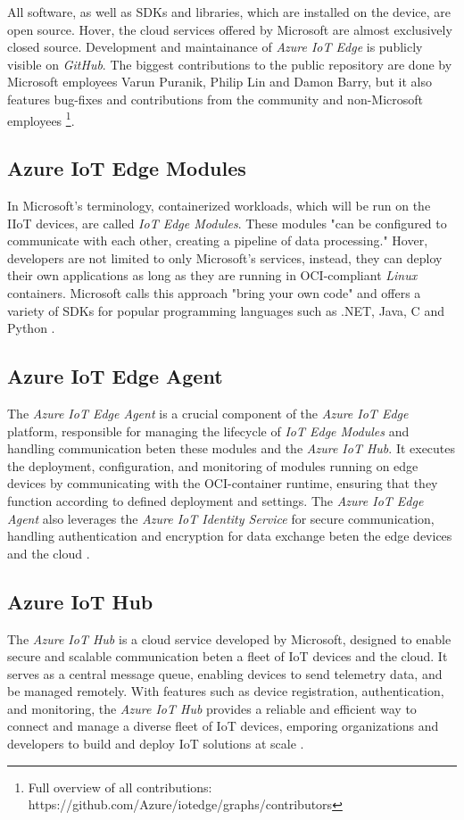 All software, as well as \ac{SDK}s and
libraries, which are installed on the device, are open source. Hover, the
cloud services offered by Microsoft are almost exclusively closed source.
Development and maintainance of \textit{Azure IoT Edge} is publicly visible on
\textit{GitHub}. The biggest contributions
to the public repository are done by Microsoft employees Varun Puranik,
Philip Lin and Damon Barry, but it also features bug-fixes and contributions
from the community and non-Microsoft employees
\footnote{Full overview of all contributions: https://github.com/Azure/iotedge/graphs/contributors}.

\subsection{Azure IoT Edge Modules}
In Microsoft's terminology, containerized workloads, which will be run on the \ac{IIoT}
devices, are called \textit{IoT Edge Modules}. These modules "can be configured to
communicate with each other, creating a pipeline of data processing." Hover, developers are
not limited to only Microsoft's services, instead, they can deploy their own
applications as long as they are running in \ac{OCI}-compliant \textit{Linux} containers.
Microsoft calls this approach "bring your own code" and offers a variety of
\ac{SDK}s for popular programming languages such as .NET, Java, C and Python
\cite{msdoc-supportetplatforms}.

\subsection{Azure IoT Edge Agent}
The \textit{Azure IoT Edge Agent} is a crucial component of the \textit{Azure IoT Edge}
platform, responsible for managing the lifecycle of \textit{IoT Edge Modules} and
handling communication beten these modules and the \textit{Azure IoT Hub}.
It executes the deployment, configuration, and monitoring of modules running on
edge devices by communicating with the \ac{OCI}-container runtime,
ensuring that they function according to defined deployment and settings.
The \textit{Azure IoT Edge Agent} also leverages the \textit{Azure IoT Identity Service}
for secure communication, handling authentication and encryption for data exchange
beten the edge devices and the cloud \cite{msdoc-aziotedge-arch}.


\subsection{Azure IoT Hub}
The \textit{Azure IoT Hub} is a cloud service developed by Microsoft, designed to
enable secure and scalable communication beten a fleet of \ac{IoT} devices and
the cloud. It serves as a central message queue, enabling devices to send telemetry
data, and be managed remotely. With features such as device registration,
authentication, and monitoring, the \textit{Azure IoT Hub} provides a reliable and efficient
way to connect and manage a diverse fleet of \ac{IoT} devices, emporing
organizations and developers to build and deploy \ac{IoT} solutions at scale \cite{msdoc-aziothub}.

